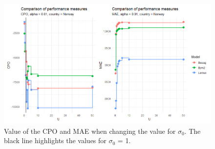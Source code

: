 \begin{figure}[H]
    \centering
    \includegraphics[width = \textwidth]{comparison_2_norway.png}
    \caption{Value of the CPO and MAE when changing the value for $\sigma_0$. The black line highlights the values for $\sigma_0$ = 1.}
    \label{comparison_norway_2}
\end{figure}
%     

